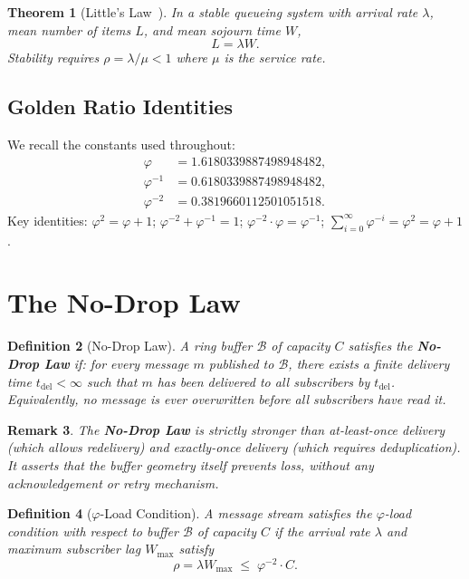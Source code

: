 \documentclass[12pt]{article}
\newtheorem{theorem}{Theorem}
\newtheorem{definition}[theorem]{Definition}
\newtheorem{remark}[theorem]{Remark}
\newcommand{\PHI}{\varphi}
\newcommand{\PHIINV}{\varphi^{-1}}
\newcommand{\AMOR}{\varphi^{-2}}
\newcommand{\Buf}{\mathcal{B}}
\newcommand{\SCAP}{C}
\newcommand{\load}{\rho}
\newcommand{\NoDrop}{\textbf{No-Drop Law}}
\begin{document}
\begin{theorem}[Little's Law~\cite{Little1961}]
\label{thm:little}
In a stable queueing system with arrival rate $\lambda$, mean number of items
$L$, and mean sojourn time $W$,
\[
  L = \lambda W.
\]
Stability requires $\load = \lambda / \mu < 1$ where $\mu$ is the service rate.
\end{theorem}

\subsection{Golden Ratio Identities}

We recall the constants used throughout:
\begin{align*}
  \PHI   &= 1.6180339887498948482, \\
  \PHIINV &= 0.6180339887498948482, \\
  \AMOR  &= 0.3819660112501051518.
\end{align*}
Key identities: $\PHI^2 = \PHI + 1$; $\AMOR + \PHIINV = 1$; $\AMOR \cdot \PHI
= \PHIINV$; $\sum_{i=0}^{\infty}\PHI^{-i} = \PHI^2 = \PHI + 1$.

\section{The No-Drop Law}
\label{sec:nodrop}

\begin{definition}[No-Drop Law]
\label{def:nodrop}
A ring buffer $\Buf$ of capacity $\SCAP$ satisfies the \emph{\NoDrop{}} if:
for every message $m$ published to $\Buf$, there exists a finite delivery time
$t_{\mathrm{del}} < \infty$ such that $m$ has been delivered to all subscribers
by $t_{\mathrm{del}}$.  Equivalently, no message is ever overwritten before all
subscribers have read it.
\end{definition}

\begin{remark}
The \NoDrop{} is strictly stronger than \emph{at-least-once delivery} (which
allows redelivery) and \emph{exactly-once delivery} (which requires
deduplication).  It asserts that the buffer geometry itself prevents loss,
without any acknowledgement or retry mechanism.
\end{remark}

\begin{definition}[$\varphi$-Load Condition]
\label{def:phi-load}
A message stream satisfies the \emph{$\varphi$-load condition} with respect to
buffer $\Buf$ of capacity $\SCAP$ if the arrival rate $\lambda$ and maximum
subscriber lag $W_{\max}$ satisfy
\[
  \load = \lambda W_{\max} \;\le\; \AMOR \cdot \SCAP.
\]
\end{definition}
\end{document}
